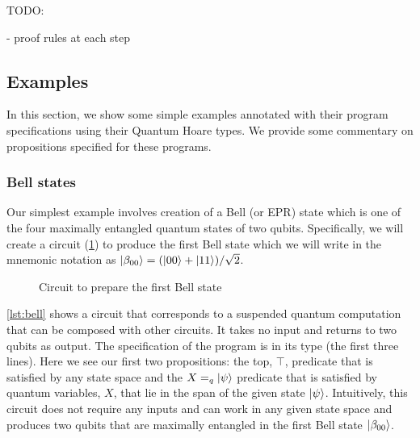 \documentclass[adraft,creativecommons]{eptcs}
\theoremstyle{definition}
\theoremstyle{remark}
\begin{document}
TODO:

- proof rules at each step

\subsection{Examples}

In this section, we show some simple examples annotated with their program specifications using their Quantum Hoare types. We provide some commentary on propositions specified for these programs.

\subsubsection{Bell states}

Our simplest example involves creation of a Bell (or EPR) state which is one of the four maximally entangled quantum states of two qubits. Specifically, we will create a circuit (\cref{fig:bell00}) to produce the first Bell state which we will write in the mnemonic notation as $\ket{\beta_{00}} = (\ket{00}+\ket{11})/\sqrt{2}$.

\begin{figure}
    \centering
    \caption{Circuit to prepare the first Bell state}
    \label{fig:bell00}
\end{figure}



\cref{lst:bell} shows a circuit that corresponds to a suspended quantum computation that can be composed with other circuits. It takes no input and returns to two qubits as output. The specification of the program is in its type (the first three lines). Here we see our first two propositions: the top, $\top$, predicate that is satisfied by any state space and the $X =_q \ket{\psi}$ predicate that is satisfied by quantum variables, $X$, that lie in the span of the given state $\ket{\psi}$. Intuitively, this circuit does not require any inputs and can work in any given state space and produces two qubits that are maximally entangled in the first Bell state $\ket{\beta_{00}}$.
\end{document}
